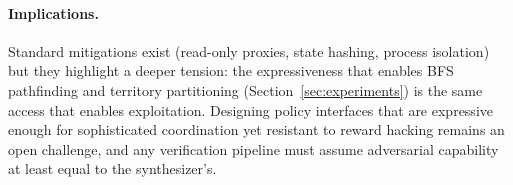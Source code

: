 \documentclass{nextgame2026} %
\begin{document}
\paragraph{Implications.}
Standard mitigations exist (read-only proxies, state hashing, process
isolation) but they highlight a deeper tension: the expressiveness
that enables BFS pathfinding and territory partitioning
(Section~\ref{sec:experiments}) is the same access that enables
exploitation.  Designing policy interfaces that are expressive enough
for sophisticated coordination yet resistant to reward hacking remains
an open challenge, and any verification pipeline must assume
adversarial capability at least equal to the synthesizer's.
\end{document}
